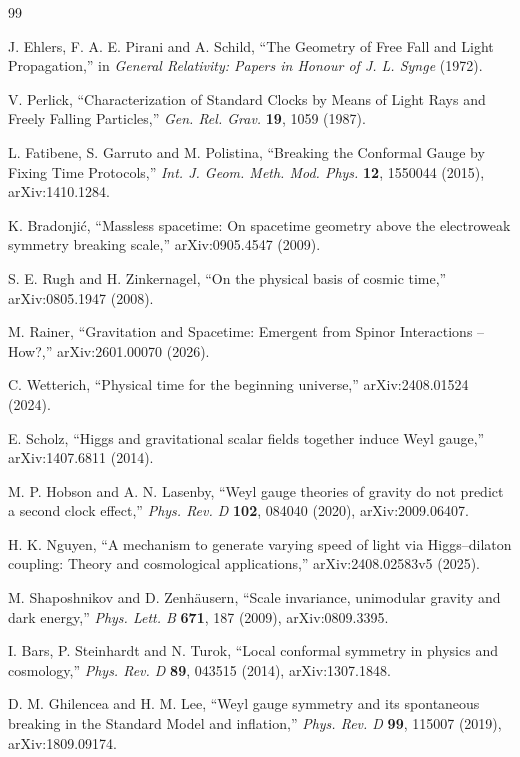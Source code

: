 \documentclass[11pt,a4paper]{article}
\begin{document}
\begin{thebibliography}{99}

J. Ehlers, F. A. E. Pirani and A. Schild,
``The Geometry of Free Fall and Light Propagation,''
in \emph{General Relativity: Papers in Honour of J. L. Synge} (1972).

V. Perlick,
``Characterization of Standard Clocks by Means of Light Rays and Freely Falling Particles,''
\emph{Gen. Rel. Grav.} \textbf{19}, 1059 (1987).

L. Fatibene, S. Garruto and M. Polistina,
``Breaking the Conformal Gauge by Fixing Time Protocols,''
\emph{Int. J. Geom. Meth. Mod. Phys.} \textbf{12}, 1550044 (2015), arXiv:1410.1284.

K. Bradonji\'c,
``Massless spacetime: On spacetime geometry above the electroweak symmetry breaking scale,''
arXiv:0905.4547 (2009).

S. E. Rugh and H. Zinkernagel,
``On the physical basis of cosmic time,''
arXiv:0805.1947 (2008).

M. Rainer,
``Gravitation and Spacetime: Emergent from Spinor Interactions -- How?,''
arXiv:2601.00070 (2026).

C. Wetterich,
``Physical time for the beginning universe,''
arXiv:2408.01524 (2024).

E. Scholz,
``Higgs and gravitational scalar fields together induce Weyl gauge,''
arXiv:1407.6811 (2014).

M. P. Hobson and A. N. Lasenby,
``Weyl gauge theories of gravity do not predict a second clock effect,''
\emph{Phys. Rev. D} \textbf{102}, 084040 (2020), arXiv:2009.06407.

H. K. Nguyen,
``A mechanism to generate varying speed of light via Higgs--dilaton coupling: Theory and cosmological applications,''
arXiv:2408.02583v5 (2025).

M. Shaposhnikov and D. Zenh\"ausern,
``Scale invariance, unimodular gravity and dark energy,''
\emph{Phys. Lett. B} \textbf{671}, 187 (2009), arXiv:0809.3395.

I. Bars, P. Steinhardt and N. Turok,
``Local conformal symmetry in physics and cosmology,''
\emph{Phys. Rev. D} \textbf{89}, 043515 (2014), arXiv:1307.1848.

D. M. Ghilencea and H. M. Lee,
``Weyl gauge symmetry and its spontaneous breaking in the Standard Model and inflation,''
\emph{Phys. Rev. D} \textbf{99}, 115007 (2019), arXiv:1809.09174.


\end{thebibliography}
\end{document}

